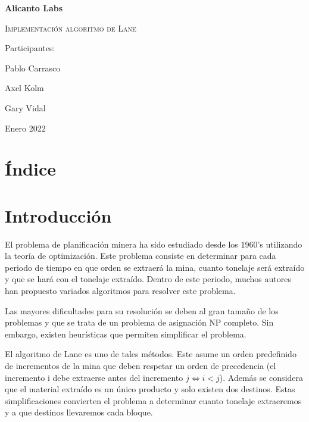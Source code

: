 \documentclass[12pt,letterpaper]{article}
\begin{document}
\begin{titlepage}
\centering
{\bfseries\LARGE Alicanto Labs \par}
\vspace{1cm}
\vspace{3cm}
{\scshape\Huge Implementación algoritmo de Lane\par}
\vspace{3cm}
\vfill

\centering  
 {\Large Participantes: \par} 
{\Large Pablo Carrasco \par} 
{\Large Axel Kolm \par} 
{\Large Gary Vidal \par} 
\vfill

{\Large Enero 2022 \par}
\end{titlepage}
   
\newpage
\section{Índice}
\renewcommand*\contentsname{Contenidos}
\tableofcontents{}
\newpage
\section{Introducción}
El problema de planificación minera ha sido estudiado desde los 1960's utilizando la teoría de optimización. Este problema consiste en determinar para cada periodo de tiempo en que orden se extraerá la mina, cuanto tonelaje será extraído y que se hará con el tonelaje extraído. Dentro de este periodo, muchos autores han propuesto variados algoritmos para resolver este problema.

Las mayores dificultades para su resolución se deben al gran tamaño de los problemas y que se trata de un problema de asignación NP completo. Sin embargo, existen heurísticas que permiten simplificar el problema.

El algoritmo de Lane es uno de tales métodos. Este asume un orden predefinido de incrementos de la mina que deben respetar un orden de precedencia (el incremento i debe extraerse antes del incremento $j \iff i<j$). Además se considera que el material extraído es un único producto y solo existen dos destinos. Estas simplificaciones convierten el problema a determinar cuanto tonelaje extraeremos y a que destinos llevaremos cada bloque.
\end{document}

